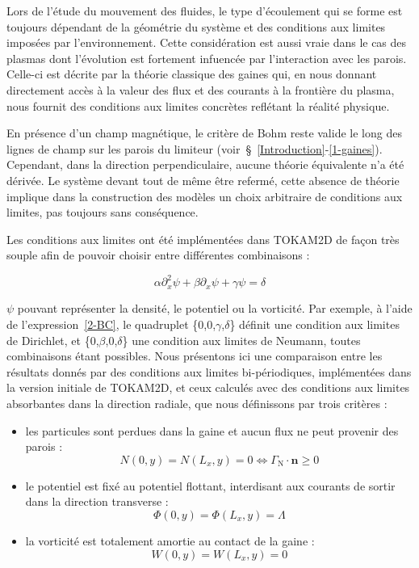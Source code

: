 \begin{refsection}
	Lors de l'étude du mouvement des fluides, le type d'écoulement qui se
	forme est toujours dépendant de la géométrie du système et des conditions aux limites
	imposées par l'environnement. Cette considération est aussi vraie dans le
	cas des plasmas dont l'évolution est fortement infuencée par l'interaction
	avec les parois. Celle-ci est décrite par la théorie classique des gaines qui, 
	en nous donnant directement accès à la valeur des flux et des courants à la
	frontière du plasma, nous fournit des conditions aux limites concrètes
	reflétant la réalité physique.
	
	En présence d'un champ magnétique, le critère de Bohm reste valide le long
	des lignes de champ sur les parois du limiteur
	(voir~\S~\ref{Introduction}-\ref{1-gaines}).
	Cependant, dans la direction perpendiculaire, aucune théorie équivalente n'a été dérivée. Le système devant
	tout de même être refermé, cette absence de théorie implique dans la
	construction des modèles un choix arbitraire de conditions aux limites, pas
	toujours sans conséquence.
	
	Les conditions aux limites ont été implémentées dans TOKAM2D de façon très
	souple afin de pouvoir choisir entre différentes combinaisons :
	
	\begin{equation}
	\label{2-BC}
		\alpha \partial^2_{x}\psi + \beta \partial_{x}\psi + \gamma \psi =
		\delta
	\end{equation}
	
	$\psi$ pouvant représenter la densité, le potentiel ou la vorticité. Par
	exemple, à l'aide de l'expression~\ref{2-BC}, le quadruplet
	\{0,0,$\gamma$,$\delta$\} définit une condition aux limites de Dirichlet, et
	\{0,$\beta$,0,$\delta$\} une condition aux limites de Neumann, toutes
	combinaisons étant possibles.
	Nous présentons ici une comparaison entre les résultats donnés par des
	conditions aux limites bi-périodiques, implémentées dans la version initiale de
	TOKAM2D, et ceux calculés avec des conditions aux limites absorbantes dans la
	direction radiale, que nous définissons par trois critères :
	
	\begin{itemize}
	  \item les particules sont perdues dans la gaine et aucun flux ne peut
	  provenir des parois :
	  \begin{equation}
	  	N(0,y)=N(L_x,y)=0 \Leftrightarrow \Gamma_\text{N}\cdot\mathbf
	  	n\ge0
	  \end{equation}
	  \item le
	potentiel est fixé au potentiel flottant, interdisant aux
	courants de sortir dans la direction transverse :
	\begin{equation}
	  	\Phi(0,y)=\Phi(L_x,y)=\Lambda
	  \end{equation}
	\item la vorticité est totalement amortie au contact de la gaine  :
	\begin{equation}
	  	W(0,y)=W(L_x,y)=0
	  \end{equation}
	\end{itemize}
	

\end{refsection}
